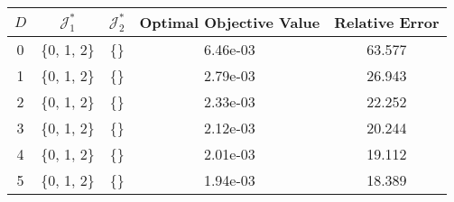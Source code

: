\begin{subtable}{\textwidth}
\centering
\begin{tabular}{|c|c|c|c|c|}
  \hline
$D$ & $\mathcal J_1^*$ & $\mathcal J_2^*$ & Optimal Objective Value & Relative Error \\ 
  \hline
0 & \{0, 1, 2\} & \{\} & 6.46e-03 & 63.577 \\ 
  1 & \{0, 1, 2\} & \{\} & 2.79e-03 & 26.943 \\ 
  2 & \{0, 1, 2\} & \{\} & 2.33e-03 & 22.252 \\ 
  3 & \{0, 1, 2\} & \{\} & 2.12e-03 & 20.244 \\ 
  4 & \{0, 1, 2\} & \{\} & 2.01e-03 & 19.112 \\ 
  5 & \{0, 1, 2\} & \{\} & 1.94e-03 & 18.389 \\ 
   \hline
\end{tabular}
\end{subtable}
